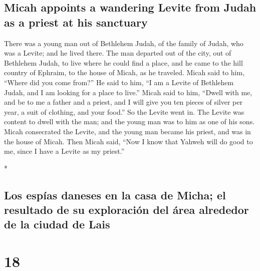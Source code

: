 \begin{paracol}{2}
\begin{otherlanguage}{english}
\hypertarget{micah-appoints-a-wandering-levite-from-judah-as-a-priest-at-his-sanctuary}{%
\subsection{Micah appoints a wandering Levite from Judah as a priest at
his
sanctuary}\label{micah-appoints-a-wandering-levite-from-judah-as-a-priest-at-his-sanctuary}}

 There was a young man out of Bethlehem Judah, of the
family of Judah, who was a Levite; and he lived there. 
The man departed out of the city, out of Bethlehem Judah, to live where
he could find a place, and he came to the hill country of Ephraim, to
the house of Micah, as he traveled.  Micah said to him,
``Where did you come from?'' He said to him, ``I am a Levite of
Bethlehem Judah, and I am looking for a place to live.'' 
Micah said to him, ``Dwell with me, and be to me a father and a priest,
and I will give you ten pieces of silver per year, a suit of clothing,
and your food.'' So the Levite went in.  The Levite was
content to dwell with the man; and the young man was to him as one of
his sons.  Micah consecrated the Levite, and the young
man became his priest, and was in the house of Micah. 
Then Micah said, ``Now I know that Yahweh will do good to me, since I
have a Levite as my priest.''

\end{otherlanguage}

\switchcolumn[0]*

\hypertarget{los-espuxedas-daneses-en-la-casa-de-micha-el-resultado-de-su-exploraciuxf3n-del-uxe1rea-alrededor-de-la-ciudad-de-lais}{%
\subsection{Los espías daneses en la casa de Micha; el resultado de su
exploración del área alrededor de la ciudad de
Lais}\label{los-espuxedas-daneses-en-la-casa-de-micha-el-resultado-de-su-exploraciuxf3n-del-uxe1rea-alrededor-de-la-ciudad-de-lais}}

\hypertarget{section-34}{%
\section{18}\label{section-34}}


\end{paracol}

